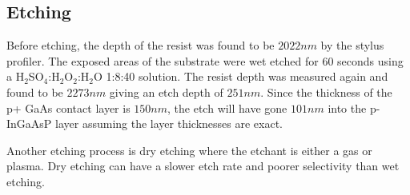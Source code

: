 \subsection{Etching}
\label{sec:fab:etching}


Before etching, the depth of the resist was found to be $2022nm$ by the stylus profiler. The exposed areas of the substrate were wet etched for 60 seconds using a H$_{2}$SO$_{4}$:H$_{2}$O$_{2}$:H$_{2}$O 1:8:40 solution. The resist depth was measured again and found to be $2273nm$ giving an etch depth of $251nm$. Since the thickness of the p+ GaAs contact layer is $150nm$, the etch will have gone $101nm$ into the p-InGaAsP layer assuming the layer thicknesses are exact.

Another etching process is dry etching where the etchant is either a gas or plasma. Dry etching can have a slower etch rate and poorer selectivity than wet etching.
